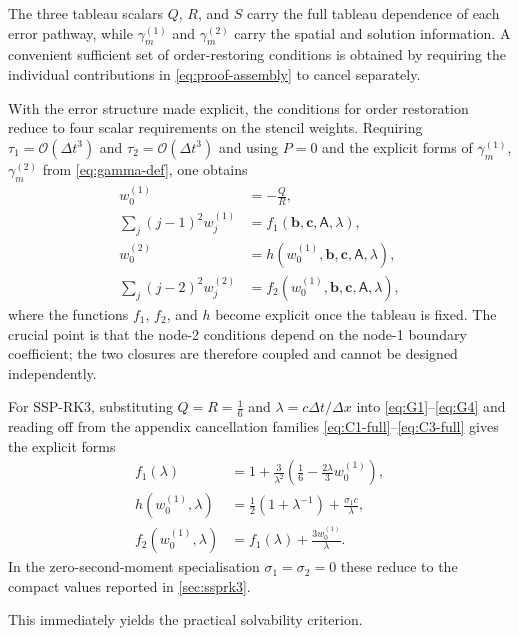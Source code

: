 \documentclass[review,hidelinks,onefignum,onetabnum]{siamart251216}
\newcommand{\Dt}{\Delta t}
\newcommand{\Dx}{\Delta x}
\newcommand{\Order}[1]{\mathcal{O}\!\left(#1\right)}
\begin{document}
The three tableau scalars $Q$, $R$, and $S$ carry the full tableau dependence of each error pathway, while $\gamma_m^{(1)}$ and $\gamma_m^{(2)}$ carry the spatial and solution information. A convenient sufficient set of order-restoring conditions is obtained by requiring the individual contributions in \eqref{eq:proof-assembly} to cancel separately.

With the error structure made explicit, the conditions for order restoration reduce to four scalar requirements on the stencil weights. Requiring $\tau_1=\Order{\Dt^3}$ and $\tau_2=\Order{\Dt^3}$ and using $P=0$ and the explicit forms of $\gamma_m^{(1)}$, $\gamma_m^{(2)}$ from \eqref{eq:gamma-def}, one obtains
\begin{align}
  w_0^{(1)} &= -\frac{Q}{R},
  \label{eq:G1}\\
  \sum_j (j-1)^2 w_j^{(1)} &= f_1(\mathbf b,\mathbf c,\mathsf A,\lambda),
  \label{eq:G2}\\
  w_0^{(2)} &= h\!\left(w_0^{(1)},\mathbf b,\mathbf c,\mathsf A,\lambda\right),
  \label{eq:G3}\\
  \sum_j (j-2)^2 w_j^{(2)} &= f_2\!\left(w_0^{(1)},\mathbf b,\mathbf c,\mathsf A,\lambda\right),
  \label{eq:G4}
\end{align}
where the functions $f_1$, $f_2$, and $h$ become explicit once the tableau is fixed. The crucial point is that the node-2 conditions depend on the node-1 boundary coefficient; the two closures are therefore coupled and cannot be designed independently.

For SSP-RK3, substituting $Q=R=\tfrac{1}{6}$ and $\lambda=c\Dt/\Dx$ into \eqref{eq:G1}--\eqref{eq:G4} and reading off from the appendix cancellation families \eqref{eq:C1-full}--\eqref{eq:C3-full} gives the explicit forms
\begin{align}
  f_1(\lambda) &= 1+\frac{3}{\lambda^2}\left(\frac{1}{6}-\frac{2\lambda}{3}w_0^{(1)}\right),
  \label{eq:G-explicit-f1}\\
  h\!\left(w_0^{(1)},\lambda\right) &= \frac{1}{2}\!\left(1+\lambda^{-1}\right)+\frac{\sigma_1 c}{\lambda},
  \label{eq:G-explicit-h}\\
  f_2\!\left(w_0^{(1)},\lambda\right) &= f_1(\lambda)+\frac{3w_0^{(1)}}{\lambda}.
  \label{eq:G-explicit-ssprk3}
\end{align}
In the zero-second-moment specialisation $\sigma_1=\sigma_2=0$ these reduce to the compact values reported in \cref{sec:ssprk3}.

This immediately yields the practical solvability criterion.
\end{document}
